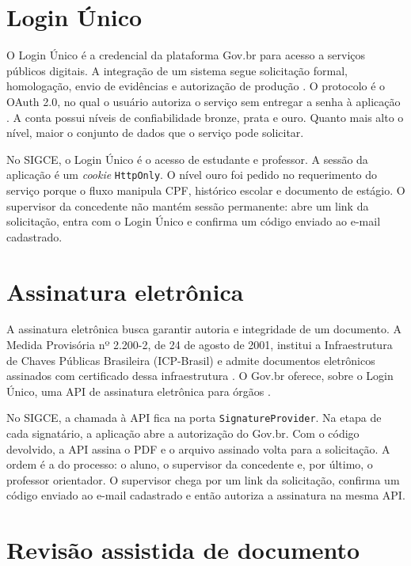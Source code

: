 \section{Login Único}

O Login Único é a credencial da plataforma Gov.br para acesso a serviços públicos digitais. A integração de um sistema segue solicitação formal, homologação, envio de evidências e autorização de produção \cite{govbrlogin}. O protocolo é o OAuth 2.0, no qual o usuário autoriza o serviço sem entregar a senha à aplicação \cite{hardt2012oauth}. A conta possui níveis de confiabilidade bronze, prata e ouro. Quanto mais alto o nível, maior o conjunto de dados que o serviço pode solicitar.

No SIGCE, o Login Único é o acesso de estudante e professor. A sessão da aplicação é um \textit{cookie} \texttt{HttpOnly}. O nível ouro foi pedido no requerimento do serviço porque o fluxo manipula CPF, histórico escolar e documento de estágio. O supervisor da concedente não mantém sessão permanente: abre um link da solicitação, entra com o Login Único e confirma um código enviado ao e-mail cadastrado.

\section{Assinatura eletrônica}

A assinatura eletrônica busca garantir autoria e integridade de um documento. A Medida Provisória nº 2.200-2, de 24 de agosto de 2001, institui a Infraestrutura de Chaves Públicas Brasileira (ICP-Brasil) e admite documentos eletrônicos assinados com certificado dessa infraestrutura \cite{mp22002}. O Gov.br oferece, sobre o Login Único, uma API de assinatura eletrônica para órgãos \cite{govbrassinaeletronica}.

No SIGCE, a chamada à API fica na porta \texttt{SignatureProvider}. Na etapa de cada signatário, a aplicação abre a autorização do Gov.br. Com o código devolvido, a API assina o PDF e o arquivo assinado volta para a solicitação. A ordem é a do processo: o aluno, o supervisor da concedente e, por último, o professor orientador. O supervisor chega por um link da solicitação, confirma um código enviado ao e-mail cadastrado e então autoriza a assinatura na mesma API.

\section{Revisão assistida de documento}

